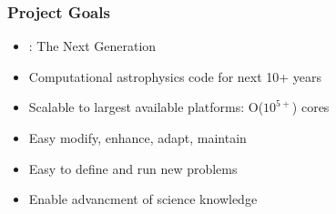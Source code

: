 \begin{frame}[fragile] \frametitle{Project Goals}
   \begin{itemize}
      \item{} \enzo: The Next Generation
      \item{} Computational astrophysics code for next 10+ years
      \item{} Scalable to largest available platforms: O($10^{5+}$)  cores
      \item{} Easy modify, enhance, adapt, maintain
      \item{} Easy to define and run new problems
      \item{} Enable advancment of science knowledge
   \end{itemize}
\end{frame}
